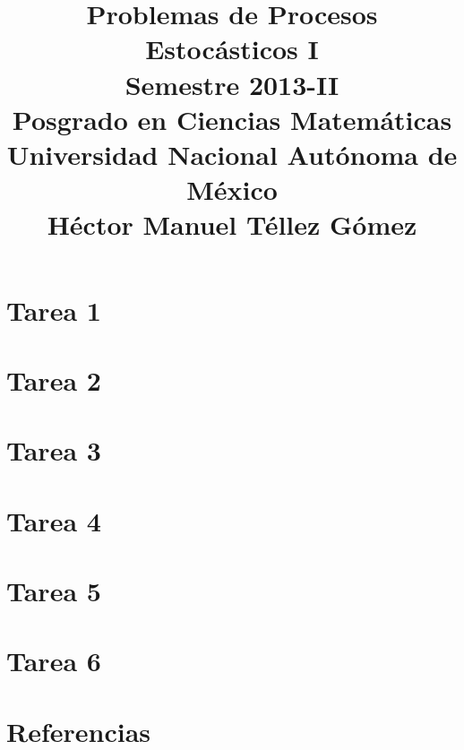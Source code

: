 \documentclass[a5paper,oneside]{amsart}
\title[Problemas de Procesos I]{
    Problemas de Procesos Estocásticos I\\ 
    Semestre 2013-II\\ 
    Posgrado en Ciencias Matemáticas\\ 
    Universidad Nacional Autónoma de México\\
    Héctor Manuel Téllez Gómez
}
\theoremstyle{definition}
\numberwithin{section}{part}
\numberwithin{equation}{subsection}
\begin{document}
    \maketitle
    \part{Tarea 1}
                
        \nqed
        
    \part{Tarea 2}
                
        \nqed
        
    \part{Tarea 3}
                
        \nqed
            
    \part{Tarea 4}
                
        \nqed    
    
    \part{Tarea 5}
                
        \nqed
    
    \part{Tarea 6}
                
        \nqed
        
    \part*{Referencias}
    
    
\end{document}
